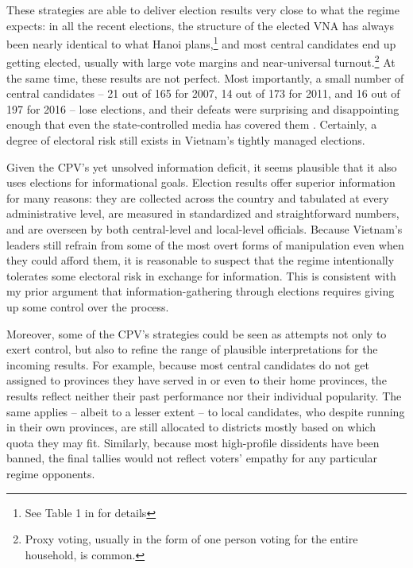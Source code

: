 \documentclass[12pt]{article}
\newcommand{\1}{\mathbbm{1}}
\begin{document}
These strategies are able to deliver election results very close to what the regime expects: in all the recent elections, the structure of the elected VNA has always been nearly identical to what Hanoi plans,\footnote{See Table 1 in \citet[][506]{MaleskySchuler2011} for  details} and most central candidates end up getting elected, usually with large vote margins and near-universal turnout.\footnote{Proxy voting, usually in the form of one person voting for the entire household, is common.} At the same time, these results are not perfect. Most importantly, a small number of central candidates -- 21 out of 165 for 2007, 14 out of 173 for 2011, and 16 out of 197 for 2016 -- lose elections, and their defeats were surprising and disappointing enough that even the state-controlled media has covered them \citep[e.g.][]{vov2016}. Certainly, a degree of electoral risk still exists in Vietnam's tightly managed elections.

Given the CPV's yet unsolved information deficit, it seems plausible that it also uses elections for informational goals. Election results offer superior information for many reasons: they are collected across the country and tabulated at every administrative level, are measured in standardized and straightforward numbers, and are overseen by both central-level and local-level officials. Because Vietnam's leaders still refrain from some of the most overt forms of manipulation even when they could afford them, it is reasonable to suspect that the regime intentionally tolerates some electoral risk in exchange for information. This is consistent with my prior argument that information-gathering through elections requires giving up some control over the process.

Moreover, some of the CPV's strategies could be seen as attempts not only to exert control, but also to refine the range of plausible interpretations for the incoming results. For example, because most central candidates do not get assigned to provinces they have served in or even to their home provinces, the results reflect neither their past performance nor their individual popularity. The same applies -- albeit to a lesser extent -- to local candidates, who despite running in their own provinces, are still allocated to districts mostly based on which quota they may fit. Similarly, because most high-profile dissidents have been banned, the final tallies would not reflect voters' empathy for any particular regime opponents.
\end{document}
